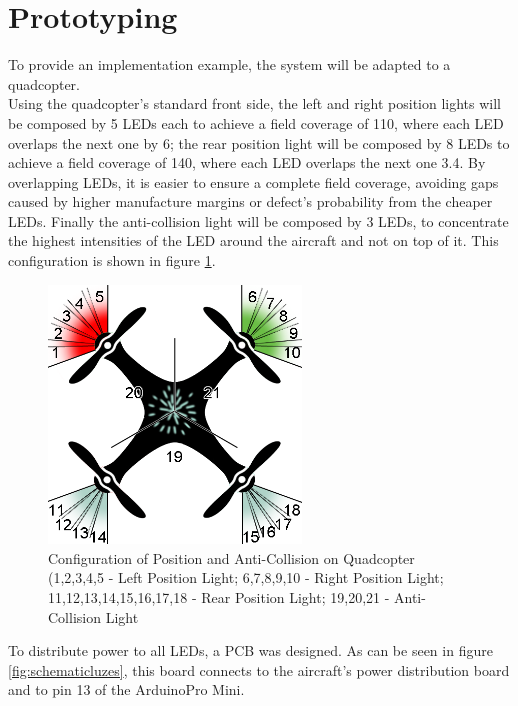 \section{Prototyping}
\label{section:pprototypes}

To provide an implementation example, the system will be adapted to a quadcopter.\\
Using the quadcopter's standard front side, the left and right position lights will be composed by 5 LEDs each to achieve a field coverage of 110\degree \citep{Easa2012}, where each LED overlaps the next one by 6\degree ; the rear position light will be composed by 8 LEDs to achieve a field coverage of 140\degree \citep{Easa2012}, where each LED overlaps the next one 3.4\degree . By overlapping LEDs, it is easier to ensure a complete field coverage, avoiding gaps caused by higher manufacture margins or defect's probability from the cheaper LEDs. Finally the anti-collision light will be composed by 3 LEDs, to concentrate the highest intensities of the LED around the aircraft and not on top of it. This configuration is shown in figure \ref{fig:esquemalights3}.\\

\begin{figure}[!htb]
  \centering
  \includegraphics[width=0.6\textwidth]{Figures/esquemalights3.png}
  \caption[Configuration of Position and Anti-Collision on Quadcopter]{Configuration of Position and Anti-Collision on Quadcopter (1,2,3,4,5 - Left Position Light; 6,7,8,9,10 - Right Position Light; 11,12,13,14,15,16,17,18 - Rear Position Light; 19,20,21 - Anti-Collision Light}
  \label{fig:esquemalights3}
\end{figure}

To distribute power to all LEDs, a PCB was designed. As can be seen in figure \ref{fig:schematicluzes}, this board connects to the aircraft's power distribution board and to pin 13 of the Arduino\texttrademark Pro Mini.

